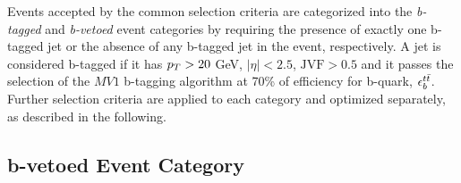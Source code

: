 Events accepted by the common selection criteria are categorized into the 
\emph{b-tagged} and \emph{b-vetoed} event categories by requiring the presence of exactly one 
b-tagged jet or the absence of any b-tagged jet in the event, respectively. A jet is considered b-tagged if it has 
$p_{T} > 20$ GeV, $|\eta| < 2.5$, $\text{JVF} > 0.5$ and it passes the selection of the $MV1$ b-tagging
algorithm at 70\% of efficiency for b-quark, $\epsilon_b^{t\bar{t}}$. Further selection criteria
are applied to each category and optimized separately, as described in the following.

\subsection{b-vetoed Event Category}\label{sec:veto}

